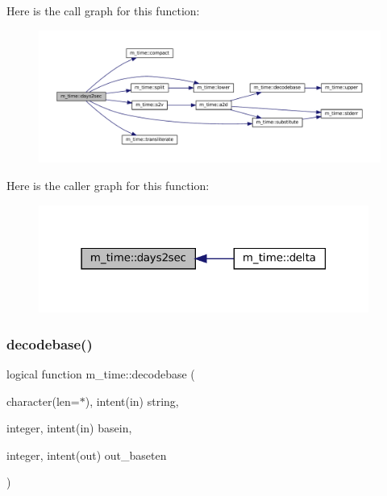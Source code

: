 Here is the call graph for this function\+:\nopagebreak
\begin{figure}[H]
\begin{center}
\leavevmode
\includegraphics[width=350pt]{namespacem__time_a99393c7906f1989f90ece03969224938_cgraph}
\end{center}
\end{figure}
Here is the caller graph for this function\+:\nopagebreak
\begin{figure}[H]
\begin{center}
\leavevmode
\includegraphics[width=307pt]{namespacem__time_a99393c7906f1989f90ece03969224938_icgraph}
\end{center}
\end{figure}
\mbox{\label{namespacem__time_a8dacab5686d74326cc68aa91b6f16c2d}} 
\subsubsection{\texorpdfstring{decodebase()}{decodebase()}}
{\footnotesize\ttfamily logical function m\+\_\+time\+::decodebase (\begin{DoxyParamCaption}\item[{character(len=$\ast$), intent(in)}]{string,  }\item[{integer, intent(in)}]{basein,  }\item[{integer, intent(out)}]{out\+\_\+baseten }\end{DoxyParamCaption})\hspace{0.3cm}{\ttfamily [private]}}



